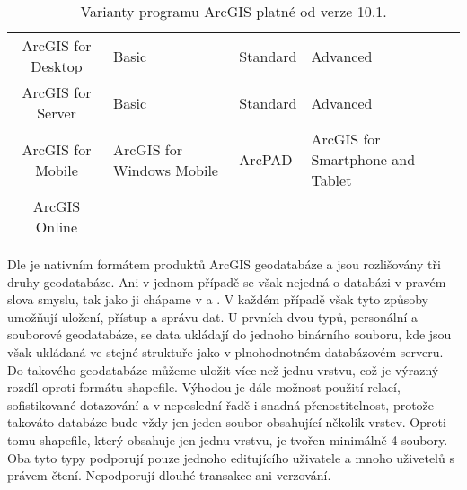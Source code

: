         \begin{table}[H]
          \caption{Varianty programu ArcGIS platné od verze 10.1.}
          \label{verzeArcGIS}
          \begin{footnotesize}
            \begin{center}
              \begin{tabular}{|>{\centering} c |>{\centering}m{9.5em}  m{8.5em}  <{\centering} m{11em}  <{\centering}|}
                \hline
                {\bf \color{purpurova7}Produkt}	& \multicolumn{3}{c|}{\bf \color{purpurova7}Verze} \\
                \hline
                ArcGIS for Desktop & Basic & Standard & Advanced \\
                 ArcGIS for Server &	Basic &	Standard &	Advanced \\
                 ArcGIS for Mobile &	ArcGIS for Windows Mobile &	ArcPAD &	ArcGIS for Smartphone and Tablet \\
                   ArcGIS Online   & & &	\\	
                \hline
              \end{tabular}
            \end{center}
          \end{footnotesize}
        \end{table}

        Dle \cite{Law2008} je nativním formátem produktů ArcGIS geodatabáze a jsou rozlišovány tři druhy geodatabáze. Ani v jednom případě se však nejedná o databázi v pravém slova smyslu, tak jako ji chápame v  a . V každém případě však tyto způsoby umožňují uložení, přístup a správu dat. U prvních dvou typů, personální a souborové geodatabáze, se data ukládají do jednoho binárního souboru, kde jsou však ukládaná ve stejné struktuře jako v plnohodnotném databázovém serveru. Do takového geodatabáze můžeme uložit více než jednu vrstvu, což je výrazný rozdíl oproti formátu shapefile. Výhodou je dále možnost použití relací, sofistikované dotazování a v neposlední řadě i snadná přenostitelnost, protože takováto databáze bude vždy jen jeden soubor obsahující několik vrstev. Oproti tomu shapefile, který obsahuje jen jednu vrstvu, je tvořen minimálně 4 soubory. Oba tyto typy podporují pouze jednoho editujícího uživatele a mnoho uživetelů s právem čtení. Nepodporují dlouhé transakce ani verzování.

